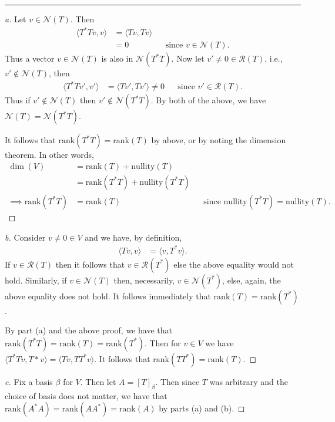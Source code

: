 \documentclass[leqno]{article}
\theoremstyle{nonumberplain}
\newtheorem{proof}{Proof}
\begin{document}
\noindent\rule[0.5ex]{\linewidth}{1pt}

\begin{proof}[a]
Let $v \in \mathcal{N}(T)$.  Then
\begin{align*}
\langle T^* T v,v \rangle &= \langle Tv,Tv \rangle\\
&= 0 &&\textrm{since $v \in \mathcal{N}(T)$}.
\end{align*}
Thus a vector $v \in \mathcal{N}(T)$ is also in $\mathcal{N}(T^*T)$.  Now let $v'\neq 0 \in \mathcal{R}(T)$, i.e., $v'\notin \mathcal{N}(T)$, then
\begin{align*}
\langle T^*Tv',v' \rangle &= \langle Tv', Tv' \rangle \neq 0 && \textrm{since $v'\in \mathcal{R}(T)$}.
\end{align*}
Thus if $v' \notin \mathcal{N}(T)$ then $v' \notin \mathcal{N}(T^* T)$. By both of the above, we have $\mathcal{N}(T)=\mathcal{N}(T^*T)$.

It follows that $\mathrm{rank}(T^* T)=\mathrm{rank}(T)$ by above, or by noting the dimension theorem.  In other words, 
\begin{align*}
\dim(V)&=\mathrm{rank}(T)+\mathrm{nullity}(T)\\
&=\mathrm{rank}(T^* T) + \mathrm{nullity}(T^* T)\\
\implies \mathrm{rank}(T^* T)&=\mathrm{rank}(T) &&\textrm{since $\mathrm{nullity}(T^* T)=\mathrm{nullity}(T)$.}
\end{align*}
\end{proof}

\begin{proof}[b]
Consider $v\neq 0 \in V$ and we have, by definition,
\begin{align*}
\langle Tv,v \rangle &= \langle v,T^* v \rangle.
\end{align*}
If $v\in \mathcal{R}(T)$ then it follows that $v\in \mathcal{R}(T^*)$ else the above equality would not hold.  Similarly, if $v\in \mathcal{N}(T)$ then, necessarily, $v\in \mathcal{N}(T^*)$, else, again, the above equality does not hold. It follows immediately that $\mathrm{rank}(T)=\mathrm{rank}(T^*)$.  

By part (a) and the above proof, we have that $\mathrm{rank}(T^* T) = \mathrm{rank}(T)=\mathrm{rank}(T^*)$. Then for $v\in V$ we have $\langle T^* Tv,T*v \rangle = \langle Tv, TT^* v\rangle$.  It follows that $\mathrm{rank}(TT^*)=\mathrm{rank}(T)$. 
\end{proof}

\begin{proof}[c]
Fix a basis $\beta$ for $V$.  Then let $A=[T]_\beta$.  Then since $T$ was arbitrary and the choice of basis does not matter, we have that $\mathrm{rank}(A^* A) =\mathrm{rank}(AA^*)=\mathrm{rank}(A)$ by parts (a) and (b).
\end{proof}
\end{document}
